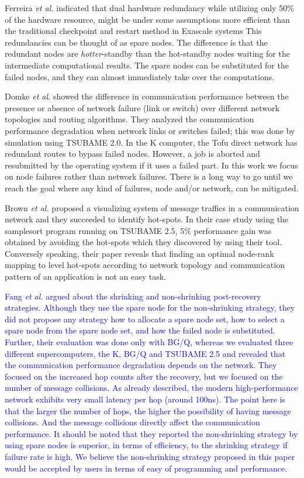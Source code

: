 \documentclass[Afour,times,sagev]{sagej}
\newcommand{\AH}[1]{%
  \textcolor{blue}{#1}}%
\begin{document}
Ferreira {\it et al.} indicated that dual hardware redundancy while
utilizing only 50\% of the hardware resource, might be under some
assumptions more efficient than the traditional checkpoint and restart
method in Exascale systems This redundancies can be thought of as
spare nodes. The difference is that the redundant nodes are {\it
  hotter}-standby than the hot-standby nodes waiting for the
intermediate computational results. The spare nodes can be substituted
for the failed nodes, and they can almost immediately take over the
computations.

Domke {\it et al.} showed the difference in communication performance
between the presence or absence of network failure (link or switch)
over different network topologies and routing
algorithms\citep{Domke:2014:FND:2683593.2683659}. They analyzed the
communication performance degradation when network links or switches
failed; this was done by simulation using TSUBAME 2.0. In the K
computer, the Tofu direct network has redundant routes to bypass
failed nodes. However, a job is aborted and resubmitted by the
operating system if it uses a failed part. In this work we focus on
node failures rather than network failures. There is a
long way to go until we reach the goal where any kind of failures,
node and/or network, can be mitigated.

Brown {\it et al.} proposed a visualizing system of message traffics
in a communication network\cite{7384355} and they succeeded to
identify hot-spots. In their case study using the samplesort program
running on TSUBAME 2.5, 5\% performance gain was obtained by avoiding
the hot-spots which they discovered by using their tool. Conversely
speaking, their paper reveals that finding an optimal node-rank
mapping to level hot-spots according to network topology and
communication pattern of an application is not an easy task.

\AH{Fang {\it et al.} argued about the shrinking and
non-shrinking post-recovery strategies. Although they use the spare
node for the non-shrinking strategy, they did not propose any
strategy how to allocate a spare node set, how to select a spare node from
the spare node set, and how the failed node is substituted. Further,
their evaluation was done only with BG/Q, whereas we evaluated three
different supercomputers, the K, BG/Q and TSUBAME 2.5 and revealed
that the communication performance degradation depends on
the network. They focused on the increased hop counts after the
recovery,  but we focused on the number of message collisions. As
already described, the modern high-performance network 
exhibits very small latency per hop (around 100ns). The point here is
that the larger the number of hops, the higher the possibility of
having message collisions. And the message collisions directly affect
the communication performance. It should be noted that they reported
the non-shrinking strategy by using spare nodes is superior, in terms
of efficiency, to the shrinking strategy if failure rate is high. We
believe the non-shrinking strategy proposed in this paper would be
accepted by users in terms of easy of programming and performance. 
}
\end{document}
